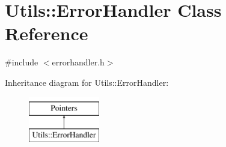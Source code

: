 \hypertarget{classUtils_1_1ErrorHandler}{}\section{Utils\+:\+:Error\+Handler Class Reference}
\label{classUtils_1_1ErrorHandler}


{\ttfamily \#include $<$errorhandler.\+h$>$}

Inheritance diagram for Utils\+:\+:Error\+Handler\+:\begin{figure}[H]
\begin{center}
\leavevmode
\includegraphics[height=2.000000cm]{classUtils_1_1ErrorHandler}
\end{center}
\end{figure}
